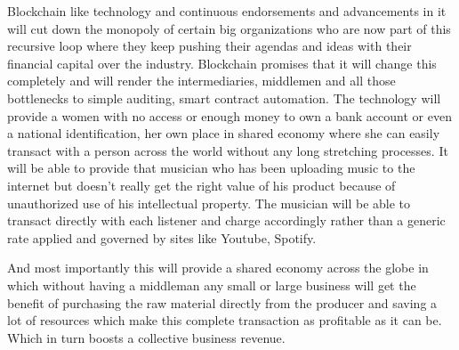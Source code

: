 Blockchain like technology and continuous endorsements and advancements in it will cut down the monopoly of certain big organizations who are now part of this recursive loop where they keep pushing their agendas and ideas with their financial capital over the industry. Blockchain promises that it will change this completely and will render the intermediaries, middlemen and all those bottlenecks to simple auditing, smart contract automation. The technology will provide a women with no access or enough money to own a bank account or even a national identification, her own place in shared economy where she can easily transact with a person across the world without any long stretching processes. It will be able to provide that musician who has been uploading music to the internet but doesn't really get the right value of his product because of unauthorized use of his intellectual property. The musician will be able to transact directly with each listener and charge accordingly rather than a generic rate applied and governed by sites like Youtube, Spotify.

And most importantly this will provide a shared economy across the globe in which without having a middleman any small or large business will get the benefit of purchasing the raw material directly from the producer and saving a lot of resources which make this complete transaction as profitable as it can be. Which in turn boosts a collective business revenue.


